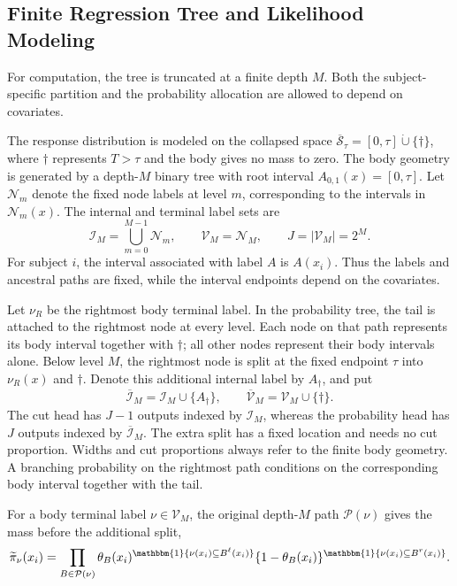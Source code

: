 \documentclass[11pt]{article}
\numberwithin{equation}{section}
\begin{document}
\subsection{Finite Regression Tree and Likelihood Modeling}
\label{section-FNRT}
For computation, the tree is truncated at a finite depth $M$. Both the subject-specific partition and the probability allocation are allowed to depend on covariates.

The response distribution is modeled on the collapsed space $\overline{\mathcal S}_\tau=[0,\tau]\mathbin{\dot\cup}\{\dagger\}$, where $\dagger$ represents $T>\tau$ and the body gives no mass to zero. The body geometry is generated by a depth-$M$ binary tree with root interval $A_{0,1}(x)=[0,\tau]$. Let $\mathcal N_m$ denote the fixed node labels at level $m$, corresponding to the intervals in $\mathcal N_m(x)$. The internal and terminal label sets are
\[
    \mathcal I_M=\bigcup_{m=0}^{M-1}\mathcal N_m,
    \qquad \mathcal V_M=\mathcal N_M,
    \qquad J=|\mathcal V_M|=2^M.
\]
For subject $i$, the interval associated with label $A$ is $A(x_i)$. Thus the labels and ancestral paths are fixed, while the interval endpoints depend on the covariates.

Let $\nu_R$ be the rightmost body terminal label. In the probability tree, the tail is attached to the rightmost node at every level. Each node on that path represents its body interval together with $\dagger$; all other nodes represent their body intervals alone. Below level $M$, the rightmost node is split at the fixed endpoint $\tau$ into $\nu_R(x)$ and $\dagger$. Denote this additional internal label by $A_\dagger$, and put
\[
    \overline{\mathcal I}_M=\mathcal I_M\cup\{A_\dagger\},
    \qquad \overline{\mathcal V}_M=\mathcal V_M\cup\{\dagger\}.
\]
The cut head has $J-1$ outputs indexed by $\mathcal I_M$, whereas the probability head has $J$ outputs indexed by $\overline{\mathcal I}_M$. The extra split has a fixed location and needs no cut proportion. Widths and cut proportions always refer to the finite body geometry. A branching probability on the rightmost path conditions on the corresponding body interval together with the tail.

For a body terminal label $\nu\in\mathcal V_M$, the original depth-$M$ path $\mathcal P(\nu)$ gives the mass before the additional split,
$$
    \widetilde\pi_\nu(x_i)
    =
    \prod_{B\in \mathcal{P}(\nu)}
    \theta_B(x_i)^{\mathbbm{1}\{\nu(x_i)\subseteq B^\ell(x_i)\}}
    \{1-\theta_B(x_i)\}^{\mathbbm{1}\{\nu(x_i)\subseteq B^r(x_i)\}}.
$$
\end{document}

